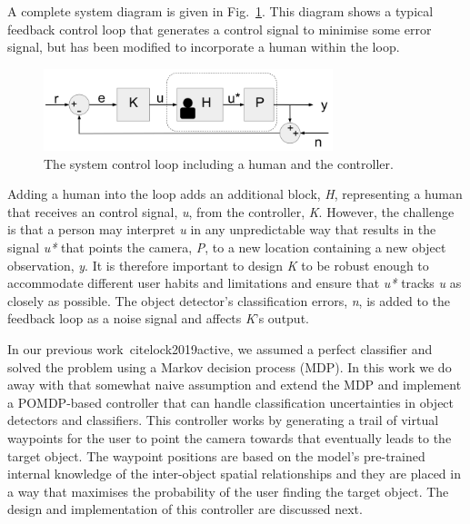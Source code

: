 \documentclass[runningheads]{llncs}
\begin{document}
A complete system diagram is given in Fig.~\ref{fig:sys-diagram}. 
This diagram shows a typical feedback control loop that generates a control signal to minimise some error signal, but has been modified to incorporate a human within the loop.

\begin{figure}
  \centering
  \includegraphics[width=0.75\textwidth]{figures/control_loop.png}
  \caption{The system control loop including a human and the controller.}\label{fig:sys-diagram}
\end{figure}

Adding a human into the loop adds an additional block, \emph{H}, representing a human that receives an control signal, \emph{u}, from the controller, \emph{K}. 
However, the challenge is that a person may interpret \emph{u} in any unpredictable way that results in the signal \emph{u*} that points the camera, \emph{P}, to a new location containing a new object observation, \emph{y}.
It is therefore important to design \emph{K} to be robust enough to accommodate different user habits and limitations and ensure that \emph{u*} tracks \emph{u} as closely as possible. 
The object detector's classification errors, \emph{n}, is added to the feedback loop as a noise signal and affects \emph{K}'s output.

In our previous work~cite{lock2019active}, we assumed a perfect classifier and solved the problem using a Markov decision process (MDP). 
In this work we do away with that somewhat naive assumption and extend the MDP and implement a POMDP-based controller that can handle classification uncertainties in object detectors and classifiers. 
This controller works by generating a trail of virtual waypoints for the user to point the camera towards that eventually leads to the target object.
The waypoint positions are based on the model's pre-trained internal knowledge of the inter-object spatial relationships and they are placed in a way that maximises the probability of the user finding the target object.
The design and implementation of this controller are discussed next.
\end{document}
